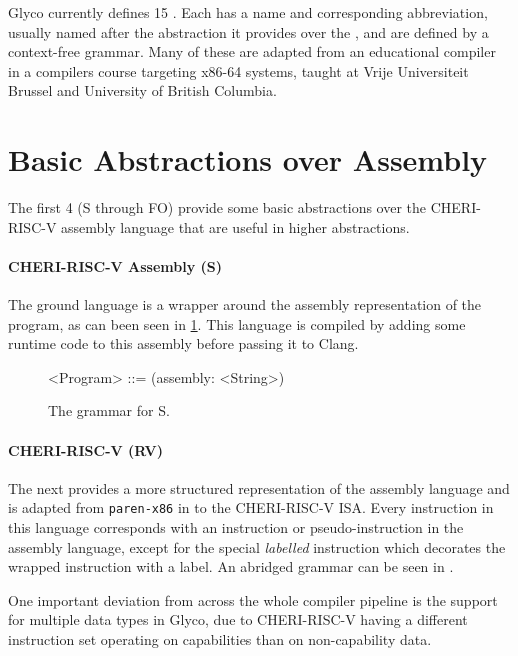 \documentclass[main.tex]{subfiles}
\begin{document}
Glyco currently defines 15 \ils{}. Each \il{} has a name and corresponding abbreviation, usually named after the abstraction it provides over the \lowerlang{}, and are defined by a context-free grammar. Many of these \ils{} are adapted from an educational compiler in a compilers course targeting x86-64 systems, taught at Vrije Universiteit Brussel \cite{:compcourse} and University of British Columbia.

\section{Basic Abstractions over Assembly}

The first 4 \ils{} (S through FO) provide some basic abstractions over the CHERI-RISC-V assembly language that are useful in higher abstractions.

\paragraph{CHERI-RISC-V Assembly (S)} The ground language is a wrapper around the assembly representation of the program, as can been seen in \cref{bnf:s}. This language is compiled by adding some runtime code to this assembly before passing it to Clang.
\begin{figure}[ht]
	\begin{grammar}
		<Program> ::= (assembly: <String>)
	\end{grammar}
	\caption{The grammar for S.}
	\label{bnf:s}
\end{figure}

\paragraph{CHERI-RISC-V (RV)} The next \il{} provides a more structured representation of the assembly language and is adapted from \texttt{paren-x86} in \cite{:compcourse} to the CHERI-RISC-V ISA. Every instruction in this language corresponds with an instruction or pseudo-instruction in the assembly language, except for the special \emph{labelled} instruction which decorates the wrapped instruction with a label. An abridged grammar can be seen in .

One important deviation from \cite{:compcourse} across the whole compiler pipeline is the support for multiple data types in Glyco, due to CHERI-RISC-V having a different instruction set operating on capabilities than on non-capability data.
\end{document}
